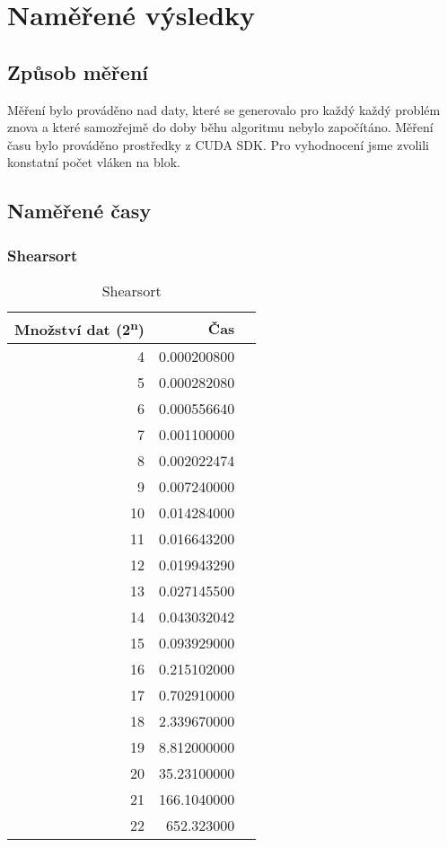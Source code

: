 \documentclass[12pt]{article}
\begin{document}
\section{Naměřené výsledky}
\subsection{Způsob měření}
Měření bylo prováděno nad daty, které se generovalo pro každý každý problém znova a které samozřejmě do doby běhu algoritmu nebylo započítáno. Měření času bylo prováděno prostředky z CUDA SDK. Pro vyhodnocení jsme zvolili konstatní počet vláken na blok.

\subsection{Naměřené časy}
\subsubsection{Shearsort}
\begin{table}[H]
\begin{center}
\begin{tabular}{|r|r|r|}
\hline Množství dat (2\textsuperscript{n}) & Čas \\ \hline
4       &  0.000200800 \\ \hline
5       &  0.000282080 \\ \hline
6       &  0.000556640 \\ \hline
7       &  0.001100000 \\ \hline
8       &  0.002022474 \\ \hline
9       &  0.007240000\\ \hline
10      &  0.014284000 \\ \hline
11      &  0.016643200 \\ \hline
12      &  0.019943290 \\ \hline
13      &  0.027145500 \\ \hline
14      &  0.043032042 \\ \hline
15      &  0.093929000 \\ \hline
16      &  0.215102000 \\ \hline
17      &  0.702910000 \\ \hline
18      &  2.339670000 \\ \hline
19      &  8.812000000 \\ \hline
20      &  35.23100000 \\ \hline
21      &  166.1040000 \\ \hline
22	&  652.323000  \\ \hline

\end{tabular} 
\end{center}
\caption{Shearsort}
\end{table} 
\end{document}
